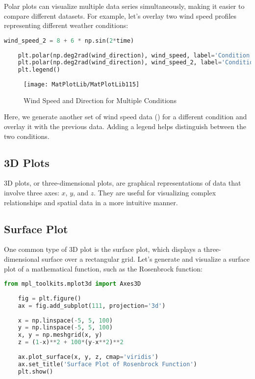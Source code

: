 Polar plots can visualize multiple data series simultaneously, making it easier to compare different datasets. For example, let's overlay two wind speed profiles representing different weather conditions:

\begin{lstlisting}[language=Python]
	wind_speed_2 = 8 + 6 * np.sin(2*time)
	
	plt.polar(np.deg2rad(wind_direction), wind_speed, label='Condition A')
	plt.polar(np.deg2rad(wind_direction), wind_speed_2, label='Condition B')
	plt.legend()
\end{lstlisting}

\begin{figure}[h]
	\centering
	\texttt{[image: MatPlotLib/MatPlotLib115]}
	\caption{Wind Speed and Direction for Multiple Conditions}\label{Matplotlib115}
\end{figure}

Here, we generate another set of wind speed data () for a different condition and overlay it with the previous data. Adding a legend helps distinguish between the two conditions.

\subsection{3D Plots}

3D plots, or three-dimensional plots, are graphical representations of data that involve three axes: \(x\), \(y\), and \(z\). They are useful for visualizing complex relationships and spatial data in a more intuitive manner.

\subsection*{Surface Plot}

One common type of 3D plot is the surface plot, which displays a three-dimensional surface over a rectangular grid. Let's generate and visualize a surface plot of a mathematical function, such as the Rosenbrock function:

\begin{lstlisting}[language=Python]
	from mpl_toolkits.mplot3d import Axes3D
	
	fig = plt.figure()
	ax = fig.add_subplot(111, projection='3d')
	
	x = np.linspace(-5, 5, 100)
	y = np.linspace(-5, 5, 100)
	x, y = np.meshgrid(x, y)
	z = (1-x)**2 + 100*(y-x**2)**2
	
	ax.plot_surface(x, y, z, cmap='viridis')
	ax.set_title('Surface Plot of Rosenbrock Function')
	plt.show()
\end{lstlisting}

